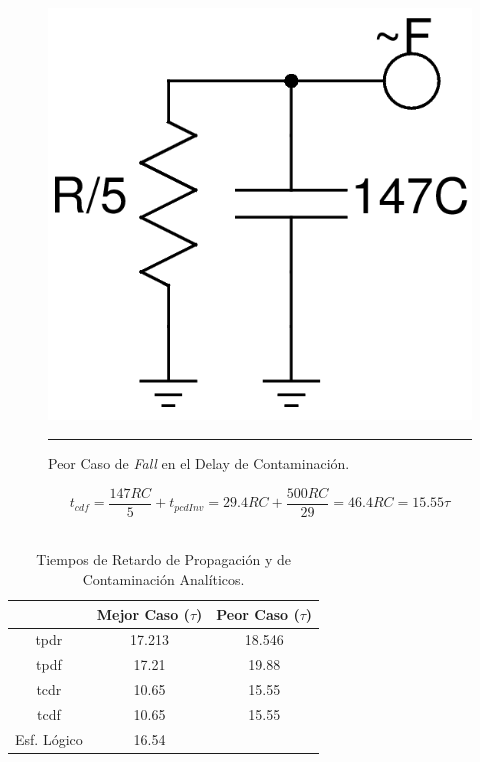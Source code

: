 \documentclass[12pt,a4paper]{article} %
\begin{document}
\begin{figure}[htbp]
  \centering
    \includegraphics[scale=0.25]{./Peor_Caso_Fall_contam.png}
    \rule{35em}{0.3pt}
  \caption[C_Carga]{Peor Caso de \textit{Fall} en el Delay de Contaminación.}
  \label{fig:Peor_Caso_Fall_contam}
\end{figure}

\begin{equation}\label{eqn:DelayC_Fall_Peor}
t_{cdf} = \frac{147RC}{5}+t_{pcdInv}=29.4RC+\frac{500RC}{29}=46.4RC=15.55\tau
\end{equation}\\


\begin{table}\label{table:Tabla_propagación_Analítica}
\begin{center}
\begin{tabular}{c||c||c}
  & Mejor Caso ($\tau$) & Peor Caso ($\tau$)\\
\hline
\hline
tpdr & 17.213 & 18.546 \\
tpdf & 17.21 & 19.88 \\
tcdr & 10.65 & 15.55\\
tcdf & 10.65 & 15.55\\
Esf. Lógico & 16.54\\


\hline
\end{tabular}
\caption{Tiempos de Retardo de Propagación y de Contaminación Analíticos.}
\end{center}
\end{table}
\end{document}
